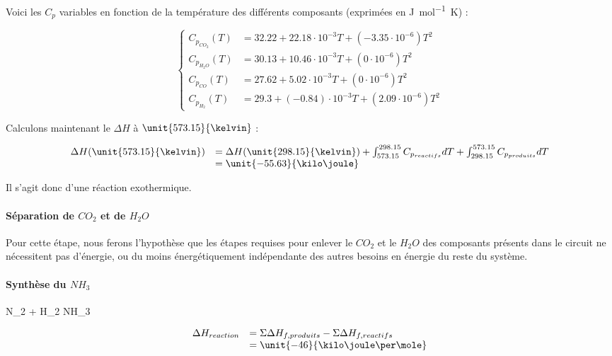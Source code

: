 Voici les $C_{p}$ variables en fonction de la température des différents composants\cite{hc-table}
(exprimées en \unit{\joule\per\mole\kelvin}) :

$$
	\left\{
		\begin{array}{rl}
			C_{p_{CO_{2}}}(T) &= 32.22 + 22.18\cdot10^{-3}T + (-3.35\cdot10^{-6})T^2\\
			C_{p_{H_2O}}(T)		&= 30.13 + 10.46\cdot10^{-3}T + (0\cdot10^{-6})T^2\\
			C_{p_{CO}}(T) 		&= 27.62 + 5.02\cdot10^{-3}T + (0\cdot10^{-6})T^2 \\
			C_{p_{H_2}}(T) 		&= 29.3 + (-0.84)\cdot10^{-3}T + (2.09\cdot10^{-6})T^2
		\end{array}
	\right.
$$
					
Calculons maintenant le $\Delta H$ à $\unit{573.15}{\kelvin}$ :			

$$
	\begin{array}{rl}
		 	 \Delta H(\unit{573.15}{\kelvin})	&=  \Delta H(\unit{298.15}{\kelvin}) 
																							+ \int_{573.15}^{298.15} C_{p_{reactifs}} dT + \int_{298.15}^{573.15} C_{p_{produits}} dT \\
																				&=  \unit{-55.63}{\kilo\joule} %
	\end{array}
$$	
	
Il s'agit donc d'une réaction exothermique.

\paragraph{Séparation de $CO_{2}$ et de $H_{2}O$}		
Pour cette étape, nous ferons l'hypothèse que les étapes requises pour enlever le $CO_{2}$ et le $H_{2}O$ 
des composants présents dans le circuit ne nécessitent pas d'énergie, ou du moins énergétiquement indépendante 
des autres besoins en énergie du reste du système.

\paragraph{Synthèse du $NH_{3}$} 
\begin{chemmath}
		N_{2} + H_2 \Longrightarrow NH_3 
\end{chemmath}	

$$
	\begin{array}{rl}
	\Delta H_{reaction}		&= \Sigma \Delta H_{f,produits} - \Sigma \Delta H_{f,reactifs} \\
												&= \unit{-46}{\kilo\joule\per\mole}
	\end{array}
$$

